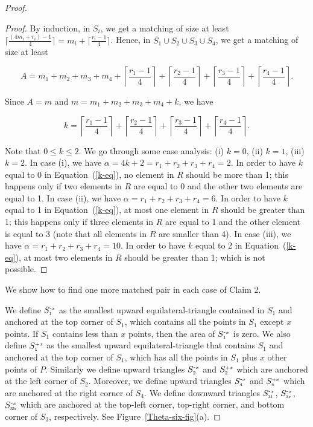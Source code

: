\documentclass[11pt,a4paper]{article}
\newcommand{\SP}[2]{S^{\text{\tiny +#1}}_\text{\tiny #2}}
\newcommand{\SM}[2]{S^{\text{-\tiny #1}}_\text{\tiny #2}}
\begin{document}
\begin{proof}
\begin{proof}
By induction, in $S_i$, we get a matching of size at least $\lceil \frac{(4m_i+r_i)-1}{4}\rceil=m_i+\lceil \frac{r_i-1}{4}\rceil$. Hence, in $S_1\cup S_2\cup S_3\cup S_4$, we get a matching of size at least

\begin{equation*}
A=m_1+m_2+m_3+m_4+\left\lceil\frac{r_1-1}{4}\right\rceil + \left\lceil\frac{r_2-1}{4}\right\rceil +\left\lceil\frac{r_3-1}{4}\right\rceil+\left\lceil \frac{r_4-1}{4}\right\rceil.
\end{equation*}

Since $A=m$ and $m=m_1+m_2+m_3+m_4+k$, we have 

\begin{equation}
\label{k-eq}
k=\left\lceil\frac{r_1-1}{4}\right\rceil + \left\lceil\frac{r_2-1}{4}\right\rceil +\left\lceil\frac{r_3-1}{4}\right\rceil+\left\lceil \frac{r_4-1}{4}\right\rceil.
\end{equation}

Note that $0\le k\le 2$.
We go through some case analysis: (i) $k=0$, (ii) $k=1$, (iii) $k=2$. In case (i), we have $\alpha =4k+2=r_1+r_2+r_3+r_4=2$. In order to have $k$ equal to 0 in Equation~(\ref{k-eq}), no element in $R$ should be more than 1; this happens only if two elements in $R$ are equal to 0 and the other two elements are equal to 1. In case (ii), we have $\alpha =r_1+r_2+r_3+r_4=6$. In order to have $k$ equal to 1 in Equation~(\ref{k-eq}), at most one element in $R$ should be greater than 1; this happens only if three elements in $R$ are equal to 1 and the other element is equal to 3 (note that all elements in $R$ are smaller than 4). In case (iii), we have $\alpha =r_1+r_2+r_3+r_4=10$. In order to have $k$ equal to 2 in Equation~(\ref{k-eq}), at most two elements in $R$ should be greater than 1; which is not possible.
\end{proof} 
We show how to find one more matched pair in each case of Claim 2.


We define $\SM{$x$}{1}$ as the smallest upward equilateral-triangle contained in $S_1$ and anchored at the top corner of $S_1$, which contains all the points in $S_1$ except $x$ points. If $S_1$ contains less than $x$ points, then the area of $\SM{$x$}{1}$ is zero. We also define $\SP{$x$}{1}$ as the smallest upward equilateral-triangle that contains $S_1$ and anchored at the top corner of $S_1$, which has all the points in $S_1$ plus $x$ other points of $P$. Similarly we define upward triangles $\SM{$x$}{2}$ and $\SP{$x$}{2}$ which are anchored at the left corner of $S_2$. Moreover, we define upward triangles $\SM{$x$}{4}$ and $\SP{$x$}{4}$ which are anchored at the right corner of $S_4$. We define downward triangles $\SM{$x$}{3l}$, $\SM{$x$}{3r}$, $\SM{$x$}{3b}$ which are anchored at the top-left corner, top-right corner, and bottom corner of $S_3$, respectively. See Figure~\ref{Theta-six-fig}(a). 


\end{proof}
\end{document}

